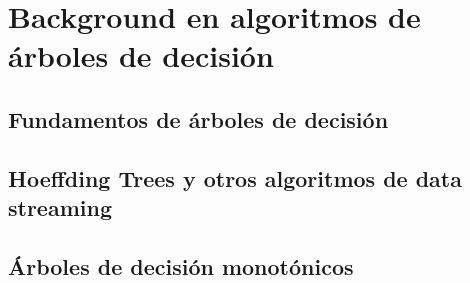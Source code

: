 \chapter[Capítulo 3. Background en algoritmos de árboles de decisión]{Background en algoritmos de árboles de decisión}

\section{Fundamentos de árboles de decisión}

\section{Hoeffding Trees y otros algoritmos de data streaming}

\section{Árboles de decisión monotónicos}


\newpage


